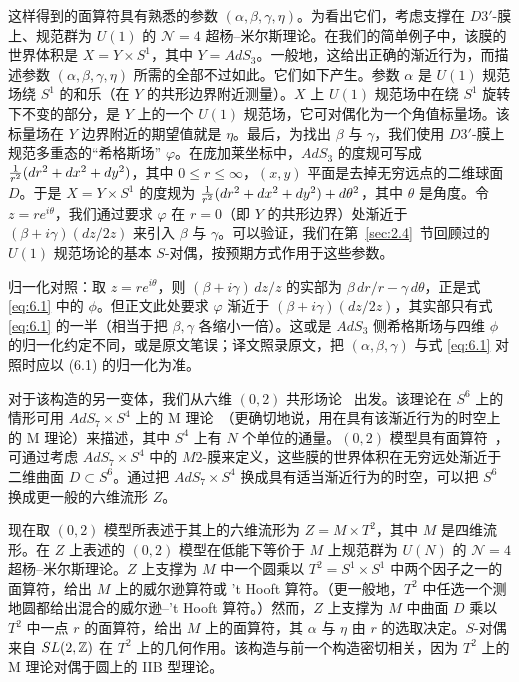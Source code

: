 这样得到的面算符具有熟悉的参数 $(\alpha,\beta,\gamma,\eta)$。为看出它们，考虑支撑在 $D3'$-膜上、规范群为 $U(1)$ 的 ${\mathcal N}=4$ 超杨–米尔斯理论。在我们的简单例子中，该膜的世界体积是 $X=Y\times S^1$，其中 $Y=AdS_3$。一般地，这给出正确的渐近行为，而描述参数 $(\alpha,\beta,\gamma,\eta)$ 所需的全部不过如此。它们如下产生。参数 $\alpha$ 是 $U(1)$ 规范场绕 $S^1$ 的和乐（在 $Y$ 的共形边界附近测量）。$X$ 上 $U(1)$ 规范场中在绕 $S^1$ 旋转下不变的部分，是 $Y$ 上的一个 $U(1)$ 规范场，它可对偶化为一个角值标量场。该标量场在 $Y$ 边界附近的期望值就是 $\eta$。最后，为找出 $\beta$ 与 $\gamma$，我们使用 $D3'$-膜上规范多重态的“希格斯场” $\varphi$。在庞加莱坐标中，$AdS_3$ 的度规可写成 ${1\over r^2}(dr^2+dx^2+dy^2)$，其中 $0\leq r\leq \infty$，$(x,y)$ 平面是去掉无穷远点的二维球面 $D$。于是 $X=Y\times S^1$ 的度规为 ${1\over
r^2}(dr^2+dx^2+dy^2)+d\theta^2$，其中 $\theta$ 是角度。令 $z=re^{i\theta}$，我们通过要求 $\varphi$ 在 $r=0$（即 $Y$ 的共形边界）处渐近于 $(\beta+i\gamma)(dz/2z)$ 来引入 $\beta$ 与 $\gamma$。可以验证，我们在第~\ref{sec:2.4}~节回顾过的 $U(1)$ 规范场论的基本 $S$-对偶，按预期方式作用于这些参数。

\begin{yizhu}[原文疑误]归一化对照：取 $z=re^{i\theta}$，则 $(\beta+i\gamma)\,dz/z$ 的实部为 $\beta\,dr/r-\gamma\,d\theta$，正是式 \eqref{eq:6.1} 中的 $\phi$。但正文此处要求 $\varphi$ 渐近于 $(\beta+i\gamma)(dz/2z)$，其实部只有式 \eqref{eq:6.1} 的一半（相当于把 $\beta,\gamma$ 各缩小一倍）。这或是 $AdS_3$ 侧希格斯场与四维 $\phi$ 的归一化约定不同，或是原文笔误；译文照录原文，把 $(\alpha,\beta,\gamma)$ 与式 \eqref{eq:6.1} 对照时应以 (6.1) 的归一化为准。\end{yizhu}


\bigskip{}


对于该构造的另一变体，我们从六维 $(0,2)$ 共形场论~\cite{ref81} 出发。该理论在 $S^6$ 上的情形可用 $AdS_7\times S^4$ 上的 M 理论~\cite{ref85}（更确切地说，用在具有该渐近行为的时空上的 M 理论）来描述，其中 $S^4$ 上有 $N$ 个单位的通量。$(0,2)$ 模型具有面算符~\cite{ref88,ref89}，可通过考虑 $AdS_7\times S^4$ 中的 $M2$-膜来定义，这些膜的世界体积在无穷远处渐近于二维曲面 $D\subset S^6$。通过把 $AdS_7\times S^4$ 换成具有适当渐近行为的时空，可以把 $S^6$ 换成更一般的六维流形 $Z$。

现在取 $(0,2)$ 模型所表述于其上的六维流形为 $Z=M\times T^2$，其中 $M$ 是四维流形。在 $Z$ 上表述的 $(0,2)$ 模型在低能下等价于 $M$ 上规范群为 $U(N)$ 的 ${\mathcal N}=4$ 超杨–米尔斯理论。$Z$ 上支撑为 $M$ 中一个圆乘以 $T^2=S^1\times S^1$ 中两个因子之一的面算符，给出 $M$ 上的威尔逊算符或 't Hooft 算符。（更一般地，$T^2$ 中任选一个测地圆都给出混合的威尔逊–'t Hooft 算符。）然而，$Z$ 上支撑为 $M$ 中曲面 $D$ 乘以 $T^2$ 中一点 $r$ 的面算符，给出 $M$ 上的面算符，其 $\alpha$ 与 $\eta$ 由 $r$ 的选取决定。$S$-对偶来自 $SL(2,{\mathbb{Z}})$ 在 $T^2$ 上的几何作用。该构造与前一个构造密切相关，因为 $T^2$ 上的 M 理论对偶于圆上的 IIB 型理论。

